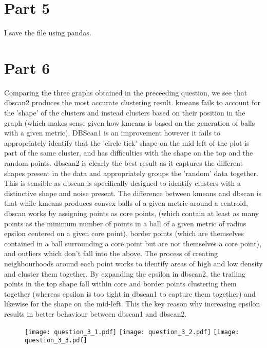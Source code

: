 \documentclass{scrreprt}
\begin{document}
\section{Part 5}\label{E3Q5}
I save the file using pandas.

\pagebreak
\section{Part 6}\label{E3Q6}
Comparing the three graphs obtained in the preceeding question, we see that dbscan2 produces the most accurate clustering result. kmeans fails to account for the 'shape' of the clusters and instead clusters based on their position in the graph (which makes sense given how kmeans is based on the generation of balls with a given metric). DBScan1 is an improvement however it fails to appropriately identify that the 'circle tick' shape on the mid-left of the plot is part of the same cluster, and has difficulties with the shape on the top and the random points. dbscan2 is clearly the best result as it captures the different shapes present in the data and appropriately groups the 'random' data together. This is sensible as dbscan is specifically designed to identify clusters with a distinctive shape and noise present. The difference between kmeans and dbscan is that while kmeans produces convex balls of a given metric around a centroid, dbscan works by assigning points as core points, (which contain at least as many points as the minimum number of points in a ball of a given metric of radius epsilon centered on a given core point), border points (which are themselves contained in a ball surrounding a core point but are not themselves a core point), and outliers which don't fall into the above. The process of creating neighbourhoods around each point works to identify areas of high and low density and cluster them together. By expanding the epsilon in dbscan2, the trailing points in the top shape fall within core and border points clustering them together (whereas epsilon is too tight in dbscan1 to capture them together) and likewise for the shape on the mid-left. This the key reason why increasing epsilon results in better behaviour between dbscan1 and dbscan2.
\begin{figure}[h!]
	\centering
	\texttt{[image: question\_3\_1.pdf]}
	\texttt{[image: question\_3\_2.pdf]}
	\texttt{[image: question\_3\_3.pdf]}
\end{figure}
\end{document}
